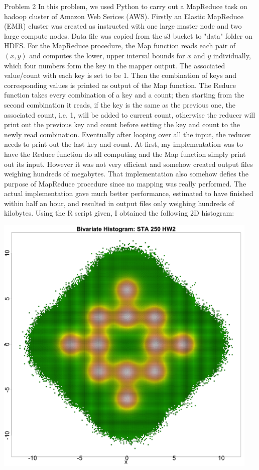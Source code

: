 \documentclass[12pt]{article}
\begin{document}
Problem 2 \newline \newline
In this problem, we used Python to carry out a MapReduce task on hadoop cluster of Amazon Web Serices (AWS). Firstly an Elastic MapReduce (EMR) cluster was created as instructed with one large master node and two large compute nodes. Data file was copied from the s3 bucket to "data" folder on HDFS. \newline
For the MapReduce procedure, the Map function reads each pair of $(x, y)$ and computes the lower, upper interval bounds for $x$ and $y$ individually, which four numbers form the key in the mapper output. The associated value/count with each key is set to be 1. Then the combination of keys and corresponding values is printed as output of the Map function. The Reduce function takes every combination of a key and a count; then starting from the second combination it reads, if the key is the same as the previous one, the associated count, i.e. 1, will be added to current count, otherwise the reducer will print out the previous key and count before setting the key and count to the newly read combination. Eventually after looping over all the input, the reducer needs to print out the last key and count. \newline
At first, my implementation was to have the Reduce function do all computing and the Map function simply print out its input. However it was not very efficient and somehow created output files weighing hundreds of megabytes. That implementation also somehow defies the purpose of MapReduce procedure since no mapping was really performed. The actual implementation gave much better performance, estimated to have finished within half an hour, and resulted in output files only weighing hundreds of kilobytes. Using the R script given, I obtained the following 2D histogram:
\begin{center}
\includegraphics[width=0.95\textwidth]{hist2d.png}
\end{center}
\end{document}
